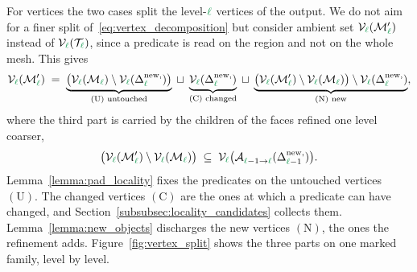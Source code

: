 \documentclass[a4paper, 12pt]{article}
\makeatletter
\newcommand{\green}{\color{ForestGreen}}
\newcommand{\T}{\mathcal{T}}
\newcommand{\V}{\mathcal{V}}
\DeclareRobustCommand{\simplexsubsetNew}[2][]{\Delta^{\mathrm{new}\ifx\@empty#1\@empty\else,#1\fi}_{#2}}
\renewcommand{\l}{{\green\ell}}
\newcommand{\Aop}[3]{\mathcal{A}^{#1}_{{#2} \to {#3}}}
\newcommand{\M}{\mathcal{M}}
\theoremstyle{definition}
\theoremstyle{plain}
\numberwithin{equation}{section}
\makeatother
\begin{document}
For vertices the two cases split the level-$\l$ vertices of the output. We do not aim for a finer split of~\eqref{eq:vertex_decomposition} but consider ambient set $\V_\l(\M'_\l)$ instead of $\V_\l(\T_\l)$, since a predicate is read on the region and not on the whole mesh. This gives
\begin{equation}
    \label{eq:vertex_decomposition_output}
    \V_\l(\M'_\l) \; = \; \underbrace{\big( \V_\l(\M_\l) \setminus \V_\l ( \simplexsubsetNew{\l} ) \big)}_{(\mathrm{U}) \text{ untouched}} \; \sqcup \; \underbrace{\V_\l ( \simplexsubsetNew{\l} )}_{(\mathrm{C}) \text{ changed}} \; \sqcup \; \underbrace{\big( \V_\l(\M'_\l) \setminus \V_\l(\M_\l) \big) \setminus \V_\l ( \simplexsubsetNew{\l} )}_{(\mathrm{N})\text{ new}} ,
\end{equation}
where the third part is carried by the children of the faces refined one level coarser,
\begin{equation}
    \label{eq:new_vertices_are_children}
    \big( \V_\l(\M'_\l) \setminus \V_\l(\M_\l) \big) \; \subseteq \; \V_\l \big( \Aop{}{\l-1}{\l} ( \simplexsubsetNew{\l-1} ) \big) .
\end{equation}
Lemma~\ref{lemma:pad_locality} fixes the predicates on the untouched vertices $(\mathrm{U})$. The changed vertices $(\mathrm{C})$ are the ones at which a predicate can have changed, and Section~\ref{subsubsec:locality_candidates} collects them. Lemma~\ref{lemma:new_objects} discharges the new vertices $(\mathrm{N})$, the ones the refinement adds. Figure~\ref{fig:vertex_split} shows the three parts on one marked family, level by level.
\end{document}
